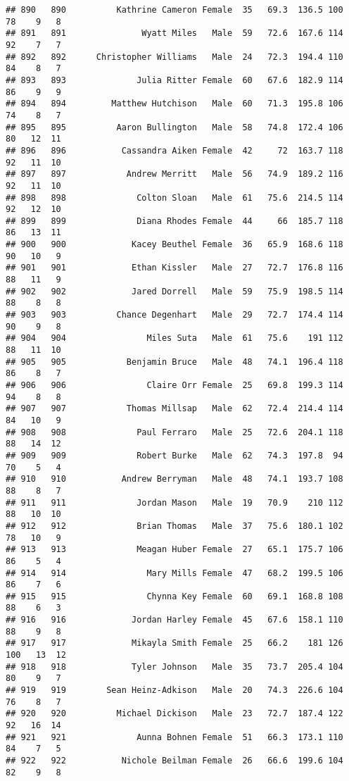 \documentclass[
]{article}
\begin{document}
\begin{verbatim}
## 890   890          Kathrine Cameron Female  35   69.3  136.5 100  78    9   8
## 891   891               Wyatt Miles   Male  59   72.6  167.6 114  92    7   7
## 892   892      Christopher Williams   Male  24   72.3  194.4 110  84    8   7
## 893   893              Julia Ritter Female  60   67.6  182.9 114  86    9   9
## 894   894         Matthew Hutchison   Male  60   71.3  195.8 106  74    8   7
## 895   895          Aaron Bullington   Male  58   74.8  172.4 106  80   12  11
## 896   896           Cassandra Aiken Female  42     72  163.7 118  92   11  10
## 897   897            Andrew Merritt   Male  56   74.9  189.2 116  92   11  10
## 898   898              Colton Sloan   Male  61   75.6  214.5 114  92   12  10
## 899   899              Diana Rhodes Female  44     66  185.7 118  86   13  11
## 900   900             Kacey Beuthel Female  36   65.9  168.6 118  90   10   9
## 901   901             Ethan Kissler   Male  27   72.7  176.8 116  88   11   9
## 902   902             Jared Dorrell   Male  59   75.9  198.5 114  88    8   8
## 903   903          Chance Degenhart   Male  29   72.7  174.4 114  90    9   8
## 904   904                Miles Suta   Male  61   75.6    191 112  88   11  10
## 905   905            Benjamin Bruce   Male  48   74.1  196.4 118  86    8   7
## 906   906                Claire Orr Female  25   69.8  199.3 114  94    8   8
## 907   907            Thomas Millsap   Male  62   72.4  214.4 114  84   10   9
## 908   908              Paul Ferraro   Male  25   72.6  204.1 118  88   14  12
## 909   909              Robert Burke   Male  62   74.3  197.8  94  70    5   4
## 910   910           Andrew Berryman   Male  48   74.1  193.7 108  88    8   7
## 911   911              Jordan Mason   Male  19   70.9    210 112  88   10  10
## 912   912              Brian Thomas   Male  37   75.6  180.1 102  78   10   9
## 913   913              Meagan Huber Female  27   65.1  175.7 106  86    5   4
## 914   914                Mary Mills Female  47   68.2  199.5 106  86    7   6
## 915   915                Chynna Key Female  60   69.1  168.8 108  88    6   3
## 916   916             Jordan Harley Female  45   67.6  158.1 110  88    9   8
## 917   917             Mikayla Smith Female  25   66.2    181 126 100   13  12
## 918   918             Tyler Johnson   Male  35   73.7  205.4 104  80    9   7
## 919   919        Sean Heinz-Adkison   Male  20   74.3  226.6 104  76    8   7
## 920   920          Michael Dickison   Male  23   72.7  187.4 122  92   16  14
## 921   921              Aunna Bohnen Female  51   66.3  173.1 110  84    7   5
## 922   922           Nichole Beilman Female  26   66.6  199.6 104  82    9   8

\end{verbatim}
\end{document}
